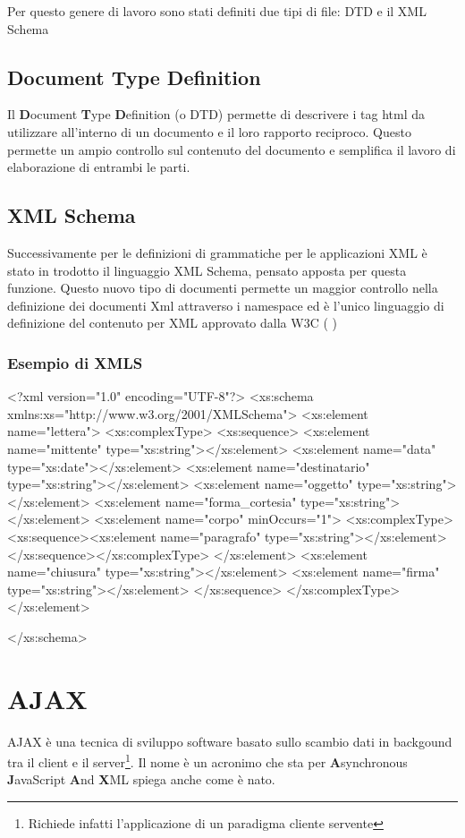 \documentclass[a4paper,12pt]{report}
\begin{document}
Per questo genere di lavoro sono stati definiti due tipi di file: DTD e il XML Schema 

\section{Document Type Definition}
Il \textbf{D}ocument \textbf{T}ype \textbf{D}efinition (o DTD) permette di descrivere i tag html da utilizzare all'interno di un documento e il loro rapporto reciproco. Questo permette un ampio controllo sul contenuto del documento e semplifica il lavoro di elaborazione di entrambi le parti. 

\section{XML Schema}
Successivamente per le definizioni di grammatiche per le applicazioni XML è stato in trodotto il linguaggio XML Schema, pensato apposta per questa funzione. Questo nuovo tipo di documenti permette un maggior controllo nella definizione dei documenti Xml attraverso i namespace ed è l'unico linguaggio di definizione del contenuto per XML approvato dalla W3C (\cite{site:w3cxmlschame} )


\subsection{Esempio di XMLS}

\begin{xml}
<?xml version="1.0" encoding="UTF-8"?>
<xs:schema xmlns:xs="http://www.w3.org/2001/XMLSchema">
<xs:element name="lettera">
<xs:complexType>
<xs:sequence>
 <xs:element name="mittente" type="xs:string"></xs:element>
 <xs:element name="data" type="xs:date"></xs:element>
 <xs:element name="destinatario" type="xs:string"></xs:element>
 <xs:element name="oggetto" type="xs:string"></xs:element>
 <xs:element name="forma_cortesia" type="xs:string"></xs:element>
 <xs:element name="corpo" minOccurs="1">
  <xs:complexType><xs:sequence><xs:element name="paragrafo" 
    type="xs:string"></xs:element></xs:sequence></xs:complexType>
 </xs:element>
 <xs:element name="chiusura" type="xs:string"></xs:element>
 <xs:element name="firma" type="xs:string"></xs:element>
</xs:sequence>
</xs:complexType></xs:element>

</xs:schema>

\end{xml}


\chapter{AJAX}
AJAX è una tecnica di sviluppo software basato sullo scambio dati in backgound tra il client e il server\footnote{Richiede infatti l'applicazione di un paradigma cliente servente}.  Il nome è un acronimo che sta per \textbf{A}synchronous \textbf{J}avaScript \textbf{A}nd \textbf{X}ML spiega anche come è nato.
\end{document}
